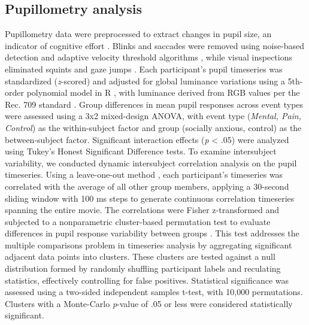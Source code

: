 \subsection*{Pupillometry analysis}
Pupillometry data were preprocessed to extract changes in pupil size, an indicator of cognitive effort \citep{beatty1982}. Blinks and saccades were removed using noise-based detection and adaptive velocity threshold algorithms \citep{hershman2018,nystrom2010}, while visual inspections eliminated squints and gaze jumps \citep{mathot2018}. Each participant's pupil timeseries was standardized (\textit{z}-scored) and adjusted for global luminance variations using a 5th-order polynomial model in R \citep{bates2015}, with luminance derived from RGB values per the Rec. 709 standard \citep{itu2002}. Group differences in mean pupil responses across event types were assessed using a 3x2 mixed-design ANOVA, with event type (\textit{Mental, Pain, Control}) as the within-subject factor and group (socially anxious, control) as the between-subject factor. Significant interaction effects (\textit{p} < .05) were analyzed using Tukey's Honest Significant Difference tests. 
To examine intersubject variability, we conducted dynamic intersubject correlation analysis on the pupil timeseries. Using a leave-one-out method \citep{nastase2019}, each participant's timeseries was correlated with the average of all other group members, applying a 30-second sliding window with 100 ms steps to generate continuous correlation timeseries spanning the entire movie. The correlations were Fisher z-transformed and subjected to a nonparametric cluster-based permutation test to evaluate differences in pupil response variability between groups \citep{maris2007}. This test addresses the multiple comparisons problem in timeseries analysis by aggregating significant adjacent data points into clusters. These clusters are tested against a null distribution formed by randomly shuffling participant labels and reculating statistics, effectively controlling for false positives. Statistical significance was assessed using a two-sided independent samples t-test, with 10,000 permutations. Clusters with a Monte-Carlo \textit{p}-value of .05 or less were considered statistically significant.


